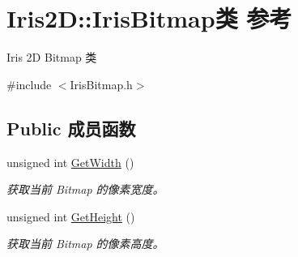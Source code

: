 \hypertarget{class_iris2_d_1_1_iris_bitmap}{}\section{Iris2D\+:\+:Iris\+Bitmap类 参考}
\label{class_iris2_d_1_1_iris_bitmap}


Iris 2D Bitmap 类  




{\ttfamily \#include $<$Iris\+Bitmap.\+h$>$}

\subsection*{Public 成员函数}
\begin{DoxyCompactItemize}
\item 
unsigned int \hyperlink{class_iris2_d_1_1_iris_bitmap_a5bf259139daf86b07d8f0ff8dad44302}{Get\+Width} ()
\begin{DoxyCompactList}\small\item\em 获取当前 Bitmap 的像素宽度。 \end{DoxyCompactList}\item 
unsigned int \hyperlink{class_iris2_d_1_1_iris_bitmap_ad97028fda44cce4622d8ab78d8ba16b9}{Get\+Height} ()
\begin{DoxyCompactList}\small\item\em 获取当前 Bitmap 的像素高度。 \end{DoxyCompactList}\end{DoxyCompactItemize}
